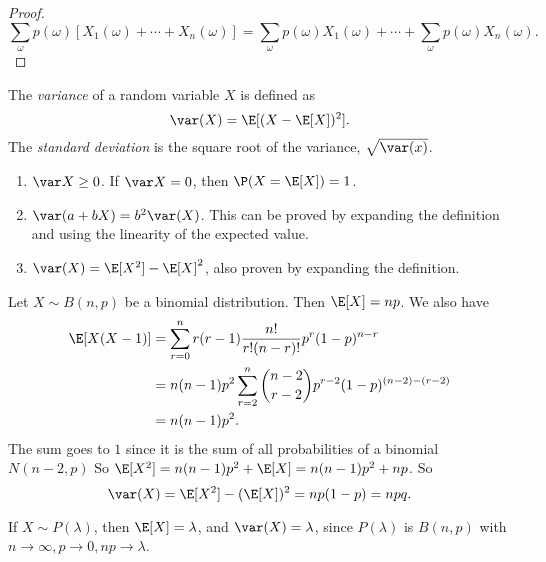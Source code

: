 \documentclass[a4paper]{article}
\begin{document}
\begin{proof}
  \[
    \sum_\omega p(\omega)[X_1(\omega) + \cdots + X_n(\omega)] = \sum_\omega p(\omega)X_1(\omega) + \cdots + \sum_\omega p(\omega) X_n(\omega).
  \]
\end{proof}

\begin{defi}
  The \emph{variance} of a random variable $X$ is defined as
  \[
    \var(X) = \E[(X - \E[X])^2].
  \]
  The \emph{standard deviation} is the square root of the variance, $\sqrt{\var(x)}$.
\end{defi}

\begin{thm}\leavevmode
  \begin{enumerate}
    \item $\var X \geq 0$. If $\var X = 0$, then $\P(X = \E[X]) = 1$.
    \item $\var (a + bX) = b^2 \var(X)$. This can be proved by expanding the definition and using the linearity of the expected value.
    \item $\var(X) = \E[X^2] - \E[X]^2$, also proven by expanding the definition.
  \end{enumerate}
\end{thm}

\begin{eg}
  Let $X\sim B(n, p)$ be a binomial distribution. Then $\E[X] = np$. We also have
  \begin{align*}
    \E[X(X - 1)] &=  \sum_{r = 0}^n r(r - 1)\frac{n!}{r!(n - r)!} p^r(1 - p)^{n - r}\\
    &= n(n - 1)p^2\sum_{r = 2}^n \binom{n - 2}{r - 2} p^{r - 2}(1 - p)^{(n - 2) - (r - 2)}\\
    &= n(n - 1)p^2.
  \end{align*}
  The sum goes to $1$ since it is the sum of all probabilities of a binomial $N(n - 2, p)$
  So $\E[X^2] = n(n - 1)p^2 + \E[X] = n(n - 1)p^2 + np$. So
  \[
    \var(X) = \E[X^2] - (\E[X])^2  = np(1 - p) = npq.
  \]
\end{eg}

\begin{eg}
  If $X\sim P(\lambda)$, then $\E[X] = \lambda$, and $\var(X) = \lambda$, since $P(\lambda)$ is $B(n, p)$ with $n\to \infty, p \to 0, np \to \lambda$.
\end{eg}
\end{document}

